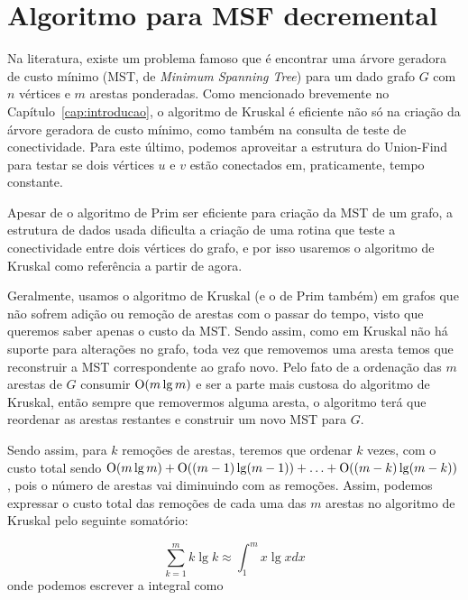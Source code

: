 
\chapter{Algoritmo para MSF decremental}

\enlargethispage{.8\baselineskip}

Na literatura, existe um problema famoso que é encontrar uma árvore geradora de custo mínimo (MST, de \textit{Minimum Spanning Tree}) para um dado grafo $G$ com $n$ vértices e $m$ arestas ponderadas. Como mencionado brevemente no Capítulo~\ref{cap:introducao}, o algoritmo de Kruskal é eficiente não só na criação da árvore geradora de custo mínimo, como também na consulta de teste de conectividade. Para este último, podemos aproveitar a estrutura do Union-Find para testar se dois vértices $u$ e $v$ estão conectados em, praticamente, tempo constante.

Apesar de o algoritmo de Prim ser eficiente para criação da MST de um grafo, a estrutura de dados usada dificulta a criação de uma rotina que teste a conectividade entre dois vértices do grafo, e por isso usaremos o algoritmo de Kruskal como referência a partir de agora.

Geralmente, usamos o algoritmo de Kruskal (e o de Prim também) em grafos que não sofrem adição ou remoção de arestas com o passar do tempo, visto que queremos saber apenas o custo da MST. Sendo assim, como em Kruskal não há suporte para alterações no grafo, toda vez que removemos uma aresta temos que reconstruir a MST correspondente ao grafo novo. Pelo fato de a ordenação das $m$ arestas de $G$ consumir $\mathrm{O}(m \lg m)$ e ser a parte mais custosa do algoritmo de Kruskal, então sempre que removermos alguma aresta, o algoritmo terá que reordenar as arestas restantes e construir um novo MST para $G$.

Sendo assim, para $k$ remoções de arestas, teremos que ordenar $k$ vezes, com o custo total sendo $\mathrm{O}(m \lg m) + \mathrm{O}((m - 1) \lg (m - 1)) + \ldots + \mathrm{O}((m - k) \lg (m - k))$, pois o número de arestas vai diminuindo com as remoções. Assim, podemos expressar o custo total das remoções de cada uma das $m$ arestas no algoritmo de Kruskal pelo seguinte somatório:

\begin{equation}
    \sum_{k=1}^{m} k \lg k \approx \int_{1}^{m} x \lg x dx
    \label{first-equation}
\end{equation}
onde podemos escrever a integral como

